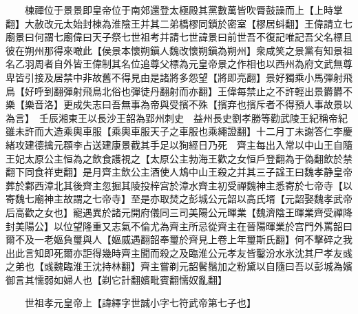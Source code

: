 　　棟禪位于景景即皇帝位于南郊還登太極殿其黨數萬皆吹脣鼓譟而上【上時掌翻】大赦改元太始封棟為淮陰王并其二弟橋樛同鎻於密室【樛居蚪翻】王偉請立七廟景曰何謂七廟偉曰天子祭七世祖考并請七世諱景曰前世吾不復記唯記吾父名標且彼在朔州那得來噉此【侯景本懷朔鎭人魏改懷朔鎭為朔州】衆咸笑之景黨有知景祖名乙羽周者自外皆王偉制其名位追尊父標為元皇帝景之作相也以西州為府文武無尊卑皆引接及居禁中非故舊不得見由是諸將多怨望【將即亮翻】景好獨乘小馬彈射飛鳥【好呼到翻彈射飛鳥北俗也彈徒丹翻射而亦翻】王偉每禁止之不許輕出景欝欝不樂【樂音洛】更成失志曰吾無事為帝與受擯不殊【擯弃也擯斥者不得預人事故景以為言】　壬辰湘東王以長沙王韶為郢州刺史　益州長史劉孝勝等勸武陵王紀稱帝紀雖未許而大造乘輿車服【乘輿車服天子之車服也乘繩證翻】十二月丁未謝答仁李慶緒攻建德擒元頵李占送建康景截其手足以狥經日乃死　齊主每出入常以中山王自隨王妃太原公主恒為之飲食護視之【太原公主勃海王歡之女恒戶登翻為于偽翻飲於禁翻下同食祥吏翻】是月齊主飲公主酒使人鴆中山王殺之并其三子諡王曰魏孝静皇帝葬於鄴西漳北其後齊主忽掘其陵投梓宫於漳水齊主初受禪魏神主悉寄於七帝寺【以寄魏七廟神主故謂之七帝寺】至是亦取焚之彭城公元韶以高氏壻【元韶娶魏孝武帝后高歡之女也】寵遇異於諸元開府儀同三司美陽公元暉業【魏濟陰王暉業齊受禪降封美陽公】以位望隆重又志氣不倫尤為齊主所忌從齊主在晉陽暉業於宫門外罵韶曰爾不及一老嫗負璽與人【嫗威遇翻韶奉璽於齊見上卷上年璽斯氏翻】何不擊碎之我出此言知即死爾亦詎得幾時齊主聞而殺之及臨淮公元孝友皆鑿汾水氷沈其尸孝友彧之弟也【彧魏臨淮王沈持林翻】齊主嘗剃元韶鬢鬚加之粉黛以自隨曰吾以彭城為嬪御言其懦弱如婦人也【剃它計翻嬪毗賓翻懦奴亂翻】

　　世祖孝元皇帝上【諱繹字世誠小字七符武帝第七子也】

